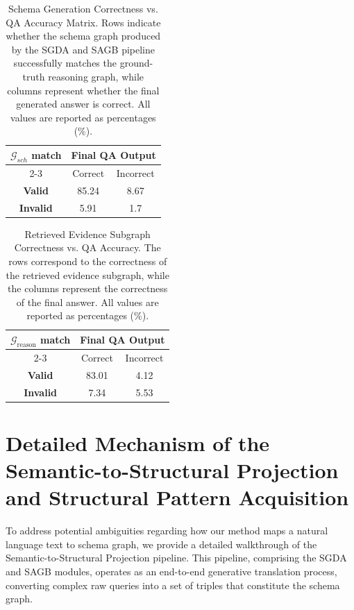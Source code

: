\documentclass[11pt]{article}
\begin{document}
\begin{table}[t]
\centering
\renewcommand{\arraystretch}{1.15}
\setlength{\tabcolsep}{6pt}

\begin{tabular}{c|cc}
\hline
\multirow{2}{*}{\( \mathcal{G}_{sch} \) \textbf{match}} & \multicolumn{2}{c}{\textbf{Final QA Output}} \\ \cline{2-3}
& Correct & Incorrect \\
\hline
\textbf{Valid} & 85.24 & 8.67 \\
\textbf{Invalid}    & 5.91 & 1.7 \\
\hline
\end{tabular}
\caption{Schema Generation Correctness vs. QA Accuracy Matrix. Rows indicate whether the schema graph produced by the SGDA and SAGB pipeline successfully matches the ground-truth reasoning graph, while columns represent whether the final generated answer is correct. All values are reported as percentages (\%).}
\label{tab:sgcqm}
\end{table}


\begin{table}[t]
\centering
\renewcommand{\arraystretch}{1.15}
\setlength{\tabcolsep}{6pt}

\begin{tabular}{c|cc}
\hline
\multirow{2}{*}{$\mathcal{G}_{\text{reason}}$ \textbf{match}} & \multicolumn{2}{c}{\textbf{Final QA Output}} \\ \cline{2-3}
& Correct & Incorrect \\
\hline
\textbf{Valid} & 83.01 & 4.12 \\
\textbf{Invalid}    & 7.34 & 5.53 \\
\hline
\end{tabular}
\caption{Retrieved Evidence Subgraph Correctness vs. QA Accuracy. The rows correspond to the correctness of the retrieved evidence subgraph, while the columns represent the correctness of the final answer. All values are reported as percentages (\%).}
\label{tab:rescq}
\end{table}

\section{Detailed Mechanism of the Semantic-to-Structural Projection and Structural Pattern Acquisition}
\label{sec:projection_pipeline}

To address potential ambiguities regarding how our method maps a natural language text to schema graph, we provide a detailed walkthrough of the Semantic-to-Structural Projection pipeline. This pipeline, comprising the SGDA and SAGB modules, operates as an end-to-end generative translation process, converting complex raw queries into a set of triples that constitute the schema graph.
\end{document}
